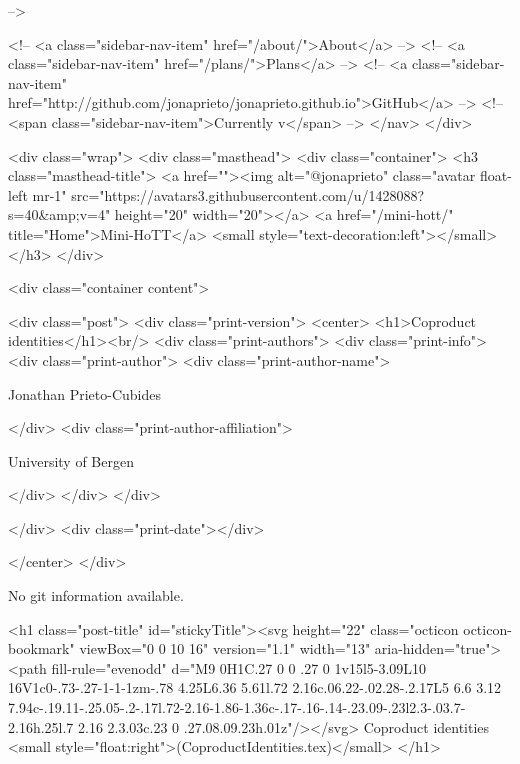       
     -->

    <!-- <a class="sidebar-nav-item" href="/about/">About</a> -->
    <!-- <a class="sidebar-nav-item" href="/plans/">Plans</a> -->
    <!-- <a class="sidebar-nav-item" href="http://github.com/jonaprieto/jonaprieto.github.io">GitHub</a> -->
    <!-- <span class="sidebar-nav-item">Currently v</span> -->
  </nav>
</div>

    <div class="wrap">
      <div class="masthead">
        <div class="container">
          <h3 class="masthead-title">
            <a href=""><img alt="@jonaprieto" class="avatar float-left mr-1" src="https://avatars3.githubusercontent.com/u/1428088?s=40&amp;v=4" height="20" width="20"></a>
            <a href="/mini-hott/" title="Home">Mini-HoTT</a>
            <small style="text-decoration:left"></small>
          </h3>
        </div>
      
      <div class="container content">
        







<div class="post">
  <div class="print-version">
    <center>
      <h1>Coproduct identities</h1><br/>
        <div class="print-authors">
          <div class="print-info">
            <div class="print-author">
              <div class="print-author-name">
                
                  Jonathan Prieto-Cubides
                
              </div>
              <div class="print-author-affiliation">
                
                  University of Bergen
                
                </div>
            </div>
          </div>
          
          
        </div>
        <div class="print-date"></div>
        
        
    </center>
  </div>

  
  No git information available.
  

  <h1 class="post-title" id="stickyTitle"><svg height="22" class="octicon octicon-bookmark" viewBox="0 0 10 16" version="1.1" width="13" aria-hidden="true"><path fill-rule="evenodd" d="M9 0H1C.27 0 0 .27 0 1v15l5-3.09L10 16V1c0-.73-.27-1-1-1zm-.78 4.25L6.36 5.61l.72 2.16c.06.22-.02.28-.2.17L5 6.6 3.12 7.94c-.19.11-.25.05-.2-.17l.72-2.16-1.86-1.36c-.17-.16-.14-.23.09-.23l2.3-.03.7-2.16h.25l.7 2.16 2.3.03c.23 0 .27.08.09.23h.01z"/></svg> Coproduct identities <small style="float:right">(CoproductIdentities.tex)</small>
  </h1>


